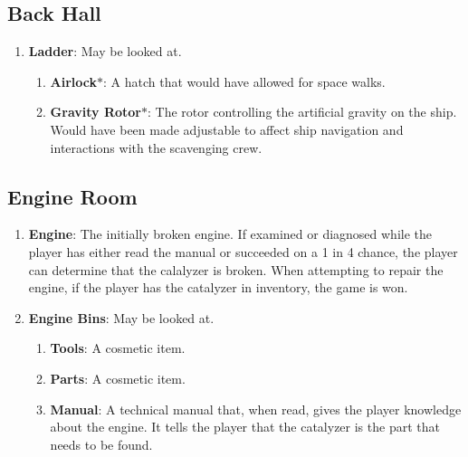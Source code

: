 \documentclass[12pt]{article}
\begin{document}
\subsection{Back Hall}

\begin{enumerate}
  \item \textbf{Ladder}: May be looked at.
  \begin{enumerate}
   \item \textbf{Airlock}$\ast$: A hatch that would have allowed for space
     walks.
   \item \textbf{Gravity Rotor}$\ast$: The rotor controlling the artificial
     gravity on the ship. Would have been made adjustable to affect ship
     navigation and interactions with the scavenging crew.
  \end{enumerate}
\end{enumerate}



\subsection{Engine Room}

\begin{enumerate}
  \item \textbf{Engine}: The initially broken engine. If examined or diagnosed
    while the player has either read the manual or succeeded on a 1 in 4 chance,
    the player can determine that the calalyzer is broken. When attempting to
    repair the engine, if the player has the catalyzer in inventory, the game is won.
  \item \textbf{Engine Bins}: May be looked at.
  \begin{enumerate}
    \item \textbf{Tools}: A cosmetic item.
    \item \textbf{Parts}: A cosmetic item.
    \item \textbf{Manual}: A technical manual that, when read, gives the player
      knowledge about the engine. It tells the player that the catalyzer is the
      part that needs to be found.
  \end{enumerate}
\end{enumerate}


\end{document}
